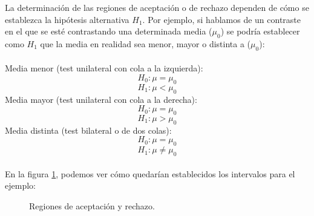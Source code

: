 La determinación de las regiones de aceptación o de rechazo dependen de cómo se establezca la hipótesis
alternativa $H_1$. Por ejemplo, si hablamos de un contraste en el que se esté contrastando una determinada
media ($\mu_0$) se podría establecer como $H_1$ que la media en realidad sea menor, mayor o distinta a
($\mu_0$):\\\\
Media menor (test unilateral con cola a la izquierda):
\[ H_0: \mu = \mu_0 \]
\[ H_1: \mu < \mu_0 \]
Media mayor (test unilateral con cola a la derecha):
\[ H_0: \mu = \mu_0 \]
\[ H_1: \mu > \mu_0 \]
Media distinta (test bilateral o de dos colas):
\[ H_0: \mu = \mu_0 \]
\[ H_1: \mu \neq \mu_0 \]
\\
En la figura \ref{fig:intervalos_normal}, podemos ver cómo quedarían establecidos los intervalos para el ejemplo:
\begin{figure}[h]
\centering
{}
\end{figure}
\begin{figure}[h]
\centering
{}
\caption{Regiones de aceptación y rechazo.}
\label{fig:intervalos_normal}
\end{figure}


